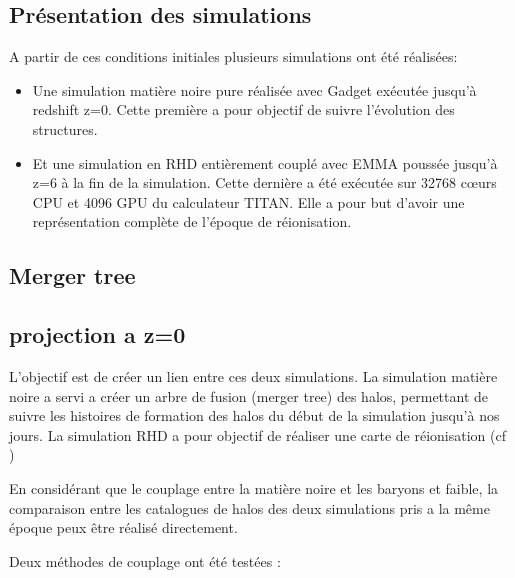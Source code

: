 

\subsection{Présentation des simulations}

A partir de ces conditions initiales plusieurs simulations ont été réalisées:

\begin{itemize}
\item Une simulation matière noire pure réalisée avec Gadget %
exécutée jusqu'à redshift z=0.
Cette première a pour objectif de suivre l'évolution des structures.

\item Et une simulation en RHD entièrement couplé avec EMMA poussée jusqu'à z=6 à la fin de la simulation.
Cette dernière a été exécutée sur 32768 cœurs CPU et 4096 GPU du calculateur TITAN.
Elle a pour but d'avoir une représentation complète de l'époque de réionisation.
\end{itemize}

\subsection{Merger tree}


\subsection{projection a z=0}


L'objectif est de créer un lien entre ces deux simulations.
La simulation matière noire a servi a créer un arbre de fusion (merger tree) des halos, permettant de suivre les histoires de formation des halos du début de la simulation jusqu'à nos jours.
La simulation RHD a pour objectif de réaliser une carte de réionisation (cf %
)


En considérant que le couplage entre la matière noire et les baryons et faible, la comparaison entre les catalogues de halos des deux simulations pris a la même époque peux être réalisé directement.


Deux méthodes de couplage ont été testées  :

